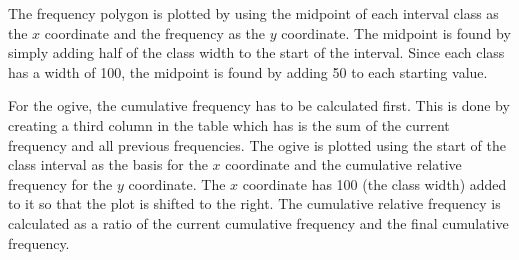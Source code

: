 \documentclass[letterpaper,12pt]{article}
\begin{document}
The frequency polygon is plotted by using the midpoint of each interval class as the $x$ coordinate and the frequency as the $y$ coordinate. The midpoint is found by simply adding half of the class width to the start of the interval. Since each class has a width of 100, the midpoint is found by adding 50 to each starting value.

For the ogive, the cumulative frequency has to be calculated first. This is done by creating a third column in the table which has is the sum of the current frequency and all previous frequencies. The ogive is plotted using the start of the class interval as the basis for the $x$ coordinate and the cumulative relative frequency for the $y$ coordinate. The $x$ coordinate has 100 (the class width) added to it so that the plot is shifted to the right. The cumulative relative frequency is calculated as a ratio of the current cumulative frequency and the final cumulative frequency.
\end{document}
